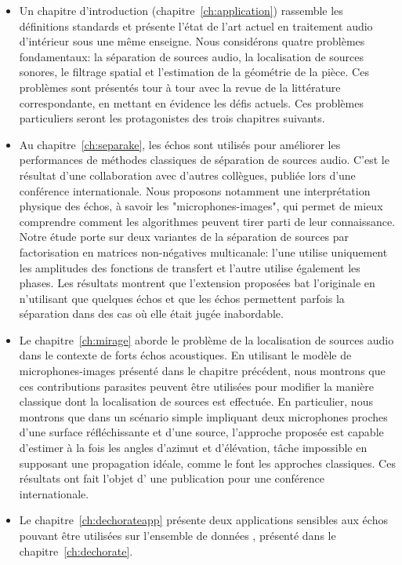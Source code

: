 \begin{itemize}
    \item
    Un chapitre d'introduction (chapitre~\ref{ch:application}) rassemble les définitions standards et présente l'état de l'art actuel en traitement audio d'intérieur sous une même enseigne.
    Nous considérons quatre problèmes fondamentaux: la séparation de sources audio, la localisation de sources sonores, le filtrage spatial et l'estimation de la géométrie de la pièce.
    Ces problèmes sont présentés tour à tour avec la revue de la littérature correspondante, en mettant en évidence les défis actuels.
    Ces problèmes particuliers seront les protagonistes des trois chapitres suivants.
    \item
    Au chapitre~\ref{ch:separake}, les échos sont utilisés pour améliorer les performances de méthodes classiques de séparation de sources audio.
    C'est le résultat d'une collaboration avec d'autres collègues, publiée lors d'une conférence internationale.
    Nous proposons notamment une interprétation physique des échos, à savoir les "microphones-images", qui permet de mieux comprendre comment les algorithmes peuvent tirer parti de leur connaissance.
    Notre étude porte sur deux variantes de la séparation de sources par factorisation en matrices non-négatives multicanale:
    l'une utilise uniquement les amplitudes des fonctions de transfert et l'autre utilise également les phases.
    Les résultats montrent que l'extension proposées bat l'originale en n'utilisant que quelques échos et que les échos permettent parfois la séparation dans des cas où elle était jugée inabordable.
    \item
    Le chapitre~\ref{ch:mirage} aborde le problème de la localisation de sources audio dans le contexte de forts échos acoustiques.
    En utilisant le modèle de microphones-images présenté dans le chapitre précédent, nous montrons que ces contributions parasites peuvent être utilisées pour modifier la manière classique dont la localisation de sources est effectuée.
    En particulier, nous montrons que dans un scénario simple impliquant deux microphones proches d'une surface réfléchissante et d'une source, l'approche proposée est capable d'estimer à la fois les angles d'azimut et d'élévation, tâche impossible en supposant une propagation idéale, comme le font les approches classiques.
    Ces résultats ont fait l'objet d' une publication pour une conférence internationale.
    \item
    Le chapitre~\ref{ch:dechorateapp} présente deux applications sensibles aux échos pouvant être utilisées sur l'ensemble de données \dEchorate, présenté dans le chapitre~\ref{ch:dechorate}.

\end{itemize}
